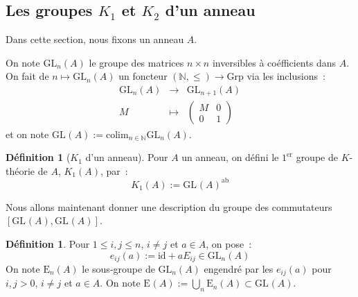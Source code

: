 \documentclass{amsart}
\theoremstyle{plain}
\theoremstyle{definition}
\newtheorem{defi}[theo]{Définition}
\theoremstyle{remark}
\newcommand{\ensemblenombre }[1]{\mathbb{#1}}
\newcommand{\N}{\ensemblenombre{N}}
\newcommand{\id}{\mathrm{id}}
\newcommand{\ab}{^\mathrm{ab}}
\newcommand{\colim}{\mathrm{colim}}
\newcommand{\Grp}{\mathrm{Grp}}
\newcommand{\GL}[2]{\mathrm{GL}_{#1}(#2)}
\newcommand{\EGL}[2]{\mathrm{E}_{#1}(#2)}
\newcommand{\ra}{\rightarrow}
\begin{document}
\subsection{\texorpdfstring{Les groupes $K_1$ et $K_2$ d'un anneau}{Les groupes K1 et K2 d'un anneau}}

Dans cette section, nous fixons un anneau $A$.

On note $\GL{n}{A}$ le groupe des matrices $n\times n$ inversibles à coéfficients dans $A$.
On fait de $n\mapsto \GL{n}{A}$ un foncteur $(\N,\leq)\ra \Grp$ via les inclusions~:
\[
  \begin{array}{lcl}
    \GL{n}{A} &\ra     & \GL{n+1}{A} \\
    M         &\mapsto & \begin{pmatrix} M & 0 \\ 0 & 1 \end{pmatrix}
  \end{array}
\]
et on note $\GL{}{A}:=\colim_{n\in\N} \GL{n}{A}$.  

\begin{defi}[$K_1$ d'un anneau]
  Pour $A$ un anneau, on défini le $1^{\mathrm{er}}$ groupe de $K$-théorie de $A$, $K_1(A)$, par~:
  $$K_1(A):=\GL{}{A}\ab$$
\end{defi}

Nous allons maintenant donner une description du groupe des commutateurs $[\GL{}{A},\GL{}{A}]$.

\begin{defi}
  Pour $1\leq i,j \leq n$, $i\neq j$ et $a\in A$, on pose~:
  $$e_{ij}(a):= \id+aE_{ij}\in \GL{n}{A}$$
  On note $\EGL{n}{A}$ le sous-groupe de $\GL{n}{A}$ engendré par les $e_{ij}(a)$ pour $i,j >0$, $i\neq j$ et $a\in A$.
  On note $\EGL{}{A}:=\bigcup_n\EGL{n}{A}\subset\GL{}{A}$.
\end{defi}
\end{document}
